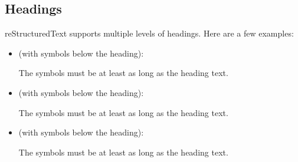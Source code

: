 \documentclass[a4paper,10pt,english]{sphinxmanual}
\begin{document}
\subsection{Headings}
\label{\detokenize{page_two:headings}}
\sphinxAtStartPar
reStructuredText supports multiple levels of headings. Here are a few examples:
\begin{itemize}
\item {} 
\sphinxAtStartPar
{} (with \sphinxtitleref{=} symbols below the heading):

\begin{sphinxVerbatim}[commandchars=\\\{\}]
\end{sphinxVerbatim}

\sphinxAtStartPar
{} The \sphinxtitleref{=} symbols must be at least as long as the heading text.

\item {} 
\sphinxAtStartPar
{} (with \sphinxtitleref{\sphinxhyphen{}} symbols below the heading):

\begin{sphinxVerbatim}[commandchars=\\\{\}]
\end{sphinxVerbatim}

\sphinxAtStartPar
{} The \sphinxtitleref{\sphinxhyphen{}} symbols must be at least as long as the heading text.

\item {} 
\sphinxAtStartPar
{} (with \sphinxtitleref{\textasciitilde{}} symbols below the heading):

\begin{sphinxVerbatim}[commandchars=\\\{\}]
\end{sphinxVerbatim}

\sphinxAtStartPar
{} The \sphinxtitleref{\textasciitilde{}} symbols must be at least as long as the heading text.

\end{itemize}
\end{document}
